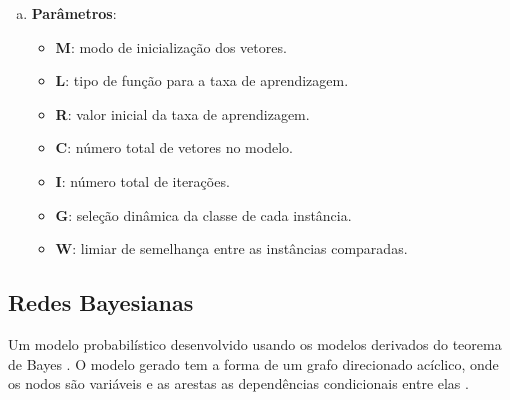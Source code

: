 \begin{enumerate}[a)]
    \item \textbf{Parâmetros}:
        \begin{itemize}

            \item \textbf{M}: modo de inicialização dos vetores.

            \item \textbf{L}: tipo de função para a taxa de aprendizagem.

            \item \textbf{R}: valor inicial da taxa de aprendizagem.

            \item \textbf{C}: número total de vetores no modelo.

            \item \textbf{I}: número total de iterações.

            \item \textbf{G}: seleção dinâmica da classe de cada instância.

            \item \textbf{W}: limiar de semelhança entre as instâncias comparadas.
        \end{itemize}
\end{enumerate}

\subsection{Redes Bayesianas}

Um modelo probabilístico desenvolvido usando os modelos derivados do teorema de Bayes \cite{Bayes1763}. O modelo gerado tem a forma de um grafo direcionado acíclico, onde os nodos são variáveis e as arestas as dependências condicionais entre elas \cite{Pearl1988}.


